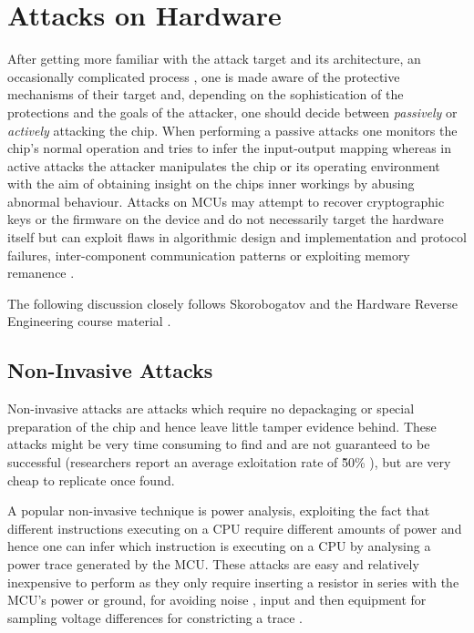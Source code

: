 \section{Attacks on Hardware}
\label{sec:curr_attacks}
After getting more familiar with the attack target and its architecture, an occasionally complicated process \citep{sergei:thesis} \citep{hwre},  one is made aware of the protective mechanisms of their target and, depending on the sophistication of the protections and the goals of the attacker, one should decide between \emph{passively} or \emph{actively} attacking the chip. When performing a passive attacks one monitors the chip's normal operation and tries to infer the input-output mapping whereas in active attacks the attacker manipulates the chip or its operating environment with the aim of obtaining insight on the chips inner workings by abusing abnormal behaviour. Attacks on MCUs may attempt to recover cryptographic keys or the firmware on the device and do not necessarily target the hardware itself but can exploit flaws in algorithmic design and implementation and protocol failures, inter-component communication patterns \citep{anderson:cautionary_note} \citep{kocher:DPA} or exploiting memory remanence \citep{sergei:thesis} \citep{gutman:memory_remanence}.

The following discussion closely follows Skorobogatov \citep{sergei:thesis} and the Hardware Reverse Engineering course material \citep{hwre}.

	\subsection{Non-Invasive Attacks}
	Non-invasive attacks are attacks which require no depackaging or special preparation of the chip and hence leave little tamper evidence behind. These attacks might be very time consuming to find and are not guaranteed to be successful (researchers report an average exloitation rate of \~50\% \citep{sergei:thesis} \citep{glitches_paper}), but are very cheap to replicate once found.
	
A popular non-invasive technique is power analysis, exploiting the fact that different instructions executing on a CPU require different amounts of power \citep{website:riscure} \citep{kocher:DPA} and hence one can infer which instruction is executing on a CPU by analysing a power trace generated by the MCU. These attacks are easy and relatively inexpensive to perform as they only require inserting a resistor in series with the MCU's power or ground, for avoiding noise \citep{sergei:thesis}, input and then equipment for sampling voltage differences for constricting a trace \citep{kocher:DPA}. 

